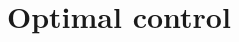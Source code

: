 \documentclass[10pt,a4paper]{report}
\begin{document}
\part{Optimal control}


	


%
%
	
\end{document}
